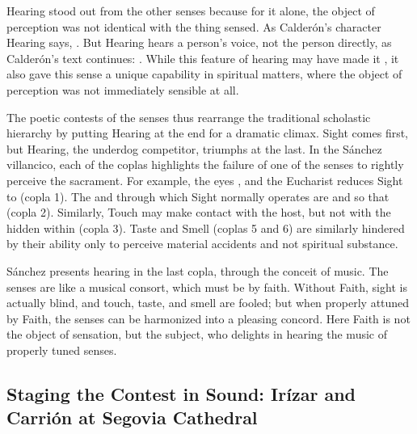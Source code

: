 Hearing stood out from the other senses because for it alone, the object of perception was not identical with the thing sensed.
As Calderón's character Hearing says, .%
\Autocite[]{Calderon:Retiro}
But Hearing hears a person's voice, not the person directly, as Calderón's text continues: .%
\Autocite[]{Calderon:Retiro}
While this feature of hearing may have made it , it also gave this sense a unique capability in spiritual matters, where the object of perception was not immediately sensible at all.

The poetic contests of the senses thus rearrange the traditional scholastic hierarchy by putting Hearing at the end for a dramatic climax.
Sight comes first, but Hearing, the underdog competitor, triumphs at the last.
In the Sánchez villancico, each of the coplas highlights the failure of one of the senses to rightly perceive the sacrament.
For example, the eyes , and the Eucharist reduces Sight to  (copla 1).
The  and  through which Sight normally operates are   and  so that  (copla 2).
Similarly, Touch may make contact with the host, but not with the  hidden within (copla 3).
Taste and Smell (coplas 5 and 6) are similarly hindered by their ability only to perceive material accidents and not spiritual substance.

Sánchez presents hearing in the last copla, through the conceit of music.
The senses are  like a musical consort, which must be  by faith.
Without Faith, sight is actually blind, and touch, taste, and smell are fooled; but when properly attuned by Faith, the senses can be harmonized into a pleasing concord.
Here Faith is not the object of sensation, but the subject, who delights in hearing the music of properly tuned senses.

\subsection{Staging the Contest in Sound: Irízar and Carrión at Segovia Cathedral}

